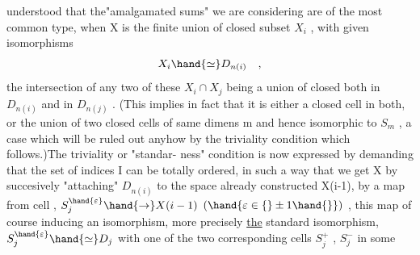 
understood that the"amalgamated sums" we are considering are of the most
common type,  when X is the finite union of closed subset $X_i$ ,  with
given isomorphisms
\[ X_i \hand{\simeq} D_{n(i)} \quad , \]
the intersection of any two of these $X_i \cap X_j$ being a union of closed 
both in $D_{n(i)}$ and in $D_{n(j)}$ . (This implies in fact that it is either
 a closed cell in both,  or the union of two closed cells of same dimens
m and hence isomorphic to $S_m$ , a case which will be ruled out anyhow
by the triviality condition  which follows.)The triviality or "standar-%
ness" condition is now expressed by demanding that the set of indices
I can be totally ordered,  in such a way that we get X by succesively
"attaching"  $D_{n(i)}$ to the space already constructed\xout{\unsure{,}} X(i-1), by a
map from  cell , $S_j^{\hand{\varepsilon}} \hand{\to} X(i-1)$ \quad $(\hand{\varepsilon\in\{}\pm 1\hand{\}})$ , this map of course
inducing an isomorphism,  more precisely \uline{the} standard isomorphism,
$S_j^{\hand{\varepsilon}} \hand{\simeq} D_j$ \quad with one of the two corresponding cells $S_j^+$ , $S_j^-$ in some
